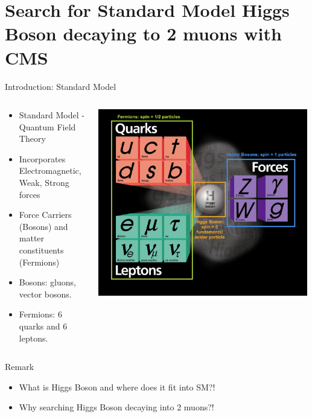 \documentclass[pdf, 9pt]{beamer}
\begin{document}
\section{Search for Standard Model Higgs Boson decaying to 2 muons with CMS}
  \begin{frame}{Introduction: Standard Model}
    \begin{columns}[T]
      \begin{column}{0.6\textwidth}
        \begin{itemize}
          \item Standard Model - Quantum Field Theory
          \item Incorporates Electromagnetic, Weak, Strong forces
          \item Force Carriers (Bosons) and matter constituents (Fermions)
          \item Bosons: gluons, vector bosons.
          \item Fermions: 6 quarks and 6 leptons.
        \end{itemize}
      \end{column}
      \begin{column}{0.4\textwidth}
        \begin{center}
          \includegraphics[width=0.99\textwidth, height=0.45\textheight]{figs/sm/sm.jpeg}
        \end{center}
      \end{column}
    \end{columns}
    \begin{block}{Remark}
      \begin{itemize}
        \item What is Higgs Boson and where does it fit into SM?!
        \item Why searching Higgs Boson decaying into 2 muons?!
      \end{itemize}
    \end{block}
  \end{frame}
\end{document}

